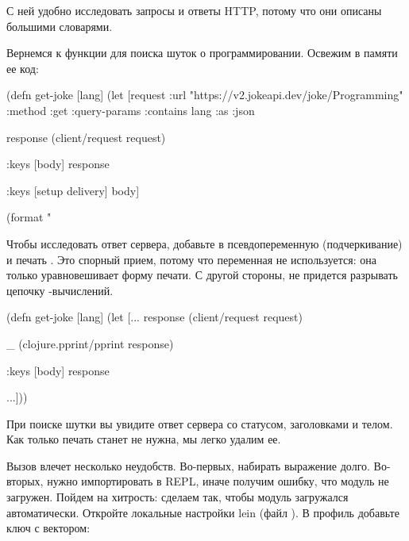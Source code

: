 С ней удобно исследовать запросы и ответы HTTP, потому что они описаны большими словарями.

Вернемся к функции  для поиска шуток о программировании. Освежим в памяти ее код:

\begin{english}
  \begin{clojure}
(defn get-joke [lang]
  (let [request
        {:url "https://v2.jokeapi.dev/joke/Programming"
         :method :get
         :query-params {:contains lang}
         :as :json}

        response
        (client/request request)

        {:keys [body]}
        response

        {:keys [setup delivery]}
        body]

    (format "%
  \end{clojure}
\end{english}

Чтобы исследовать ответ сервера, добавьте в  псевдопеременную \code{\_} (подчеркивание) и печать . Это спорный прием, потому что переменная \code{\_} не используется: она только уравновешивает форму печати. С другой стороны, не придется разрывать цепочку -вычислений.

\begin{english}
  \begin{clojure}
(defn get-joke [lang]
  (let [...
        response
        (client/request request)

        _
        (clojure.pprint/pprint response)

        {:keys [body]}
        response

        ...]))
  \end{clojure}
\end{english}

При поиске шутки вы увидите ответ сервера со статусом, заголовками и телом. Как только печать станет не нужна, мы легко удалим ее.

Вызов  влечет несколько неудобств. Во-первых, набирать выражение  долго. Во-вторых, нужно импортировать  в REPL, иначе получим ошибку, что модуль не загружен. Пойдем на хитрость: сделаем так, чтобы модуль загружался автоматически. Откройте локальные настройки lein (файл ). В профиль  добавьте ключ  с вектором:

